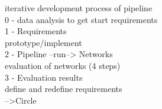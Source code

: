 iterative development process of pipeline\\
0 - data analysis to get start requirements\\
1 - Requirements\\
prototype/implement\\
2 - Pipeline --run--> Networks\\
evaluation of networks (4 steps)\\
3 - Evaluation results\\
define and redefine requirements\\
-->Circle\\







